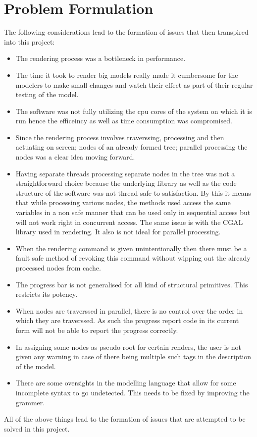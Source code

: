 \section{Problem Formulation}
The following considerations lead to the formation of issues that then transpired into this project:
\begin{itemize}
	\item The rendering process was a bottleneck in performance.
	\item The time it took to render big models really made it cumbersome for the modelers to make small changes and watch their effect as part of their regular testing of the model.
	\item The software was not fully utilizing the cpu cores of the system on which it is run hence the efficeincy as well as time consumption was compromised.
	\item Since the rendering process involves traverssing, processing and then actuating on screen; nodes of an already formed tree; parallel processing the nodes was a clear idea moving forward.
	\item Having separate threads processing separate nodes in the tree was not a straightforward choice because the underlying library as well as the code structure of the software was not thread safe to satisfaction. By this it means that while processing various nodes, the methods used access the same variables in a non safe manner that can be used only in sequential access but will not work right in concurrent access. The same issue is with the CGAL library used in rendering. It also is not ideal for parallel processing.
	\item When the rendering command is given unintentionally then there must be a fault safe method of revoking this command without wipping out the already processed nodes from cache.
	\item The progress bar is not generalised for all kind of structural primitives. This restricts its potency.
	\item When nodes are traverssed in parallel, there is no control over the order in which they are traverssed. As such the progress report code in its current form will not be able to report the progress correctly.
	\item In assigning some nodes as pseudo root for certain renders, the user is not given any warning in case of there being multiple such tags in the description of the model.
	\item There are some oversights in the modelling language that allow for some incomplete syntax to go undetected. This needs to be fixed by improving the grammer.
\end{itemize}
All of the above things lead to the formation of issues that are attempted to be solved in this project.


